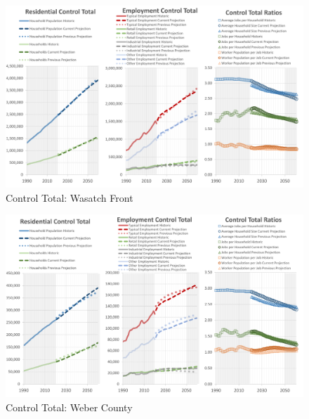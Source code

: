 \documentclass[
  letterpaper,
  DIV=11,
  numbers=noendperiod]{scrreprt}
\begin{document}
\begin{figure}[H]

{\centering \includegraphics{v9x/v900/whats-new/_pictures/pdf-control-wf.png}

}

\caption{\label{fig-pdf-control-wf}Control Total: Wasatch Front}

\end{figure}

\begin{figure}[H]

{\centering \includegraphics{v9x/v900/whats-new/_pictures/pdf-control-weber.png}

}

\caption{\label{fig-pdf-control-weber}Control Total: Weber County}

\end{figure}
\end{document}
